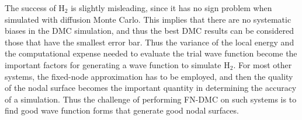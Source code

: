 \documentclass[aip,jcp,numerical,reprint]{revtex4-1}
\begin{document}
The success of H$_{2}$ is slightly misleading, since it has no sign problem when simulated with diffusion Monte Carlo.  This implies that there are no systematic biases in the DMC simulation, and thus the best DMC results can be considered those that have the smallest error bar.  Thus the variance of the local energy and the computational expense needed to evaluate the trial wave function become the important factors for generating a wave function to simulate H$_{2}$.  For most other systems, the fixed-node approximation has to be employed, and then the quality of the nodal surface becomes the important quantity in determining the accuracy of a simulation.  Thus the challenge of performing FN-DMC on such systems is to find good wave function forms that generate good nodal surfaces.

\end{document}
